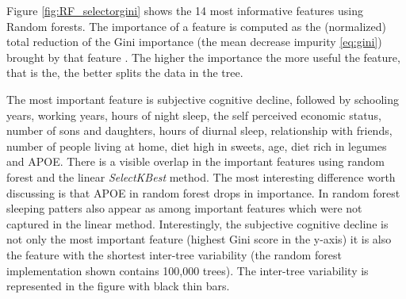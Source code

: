 \documentclass[preprint,12pt]{elsarticle}
\begin{document}

Figure \ref{fig:RF_selectorgini} shows the 14 most informative features using Random forests. The importance of a feature is computed as the (normalized) total reduction of the Gini importance (the mean decrease impurity \ref{eq:gini}) brought by that feature \cite{breiman2017classification}. The higher the importance 
the more useful the feature, that is the, the better splits the data in the tree. 






The most important feature is subjective cognitive decline, followed by schooling years, working years, hours of night sleep, the self perceived economic status, number of sons and daughters, hours of diurnal sleep, relationship with friends, number of people living at home, diet high in sweets, age, diet rich in legumes and APOE.
There is a visible overlap in the important features using random forest and the linear \emph{SelectKBest} method. The most interesting difference worth discussing is that APOE in random forest drops in importance. In random forest sleeping patters also appear as among important features which were not captured in the linear method. 
Interestingly, the subjective cognitive decline is not only the most important feature (highest Gini score in the y-axis) it is also the feature with the shortest inter-tree variability (the random forest implementation shown contains 100,000 trees). The inter-tree variability is represented in the figure with black thin bars. 
\end{document}
